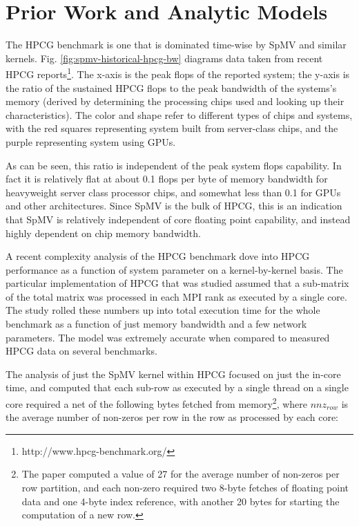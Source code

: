 \section{Prior Work and Analytic Models}\label{sec:spmv-analytic}


\begin{figure*}\begin{centering}
\caption{HPCG Flops per Byte of Memory Bandwidth vs. Peak flops.}
\label{fig:spmv-historical-hpcg-bw}
\end{centering}\end{figure*}

The HPCG benchmark \cite{techbib:hpcg-snl-dongarra} is one that is dominated time-wise by SpMV and similar kernels. Fig. \ref{fig:spmv-historical-hpcg-bw} diagrams data taken from recent HPCG reports\footnote{http://www.hpcg-benchmark.org/}. The x-axis is the peak flops of the reported system; the y-axis is the ratio of the sustained HPCG flops to the peak bandwidth of the systems's memory (derived by determining the processing chips used and looking up their characteristics). The color and shape refer to different types of chips and systems, with the red squares representing system built from server-class chips, and the purple representing system using GPUs. 

As can be seen, this ratio is independent of the peak system flops capability. In fact it is relatively flat at about 0.1 flops per byte of memory bandwidth for heavyweight server class processor chips, and somewhat less than 0.1 for GPUs and other architectures. Since SpMV is the bulk of HPCG, this is an indication that SpMV is relatively independent of core floating point capability, and instead highly dependent on chip memory bandwidth.

A recent complexity analysis of the HPCG benchmark \cite{techbib:marjanovic2014performance} dove into HPCG performance as a function of system parameter on a kernel-by-kernel basis. The particular implementation of HPCG that was studied assumed that a sub-matrix of the total matrix was processed in each MPI rank as executed by a single core. The study rolled these numbers up into total execution time for the whole benchmark as a function of just memory bandwidth and a few network parameters. The model was extremely accurate when compared to measured HPCG data on several benchmarks.

The analysis of just the SpMV kernel within HPCG focused on just the in-core time, and computed that each sub-row as executed by a single thread on a single core required a net of the following bytes fetched from memory\footnote{The paper computed a value of 27 for the average number of non-zeros per row partition, and each non-zero required two 8-byte fetches of floating point data and one 4-byte index reference, with another 20 bytes for starting the computation of a new row.}, where $nnz_{row}$ is the average number of non-zeros per row in the row as processed by each core:

